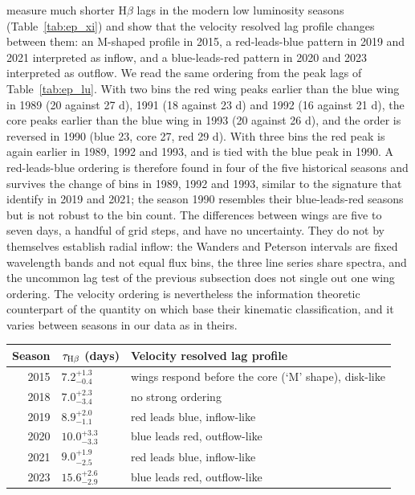 \citet{Xi2025} measure much shorter H$\beta$ lags in the modern low luminosity
seasons (Table~\ref{tab:ep_xi}) and show that the velocity resolved lag profile
changes between them: an M-shaped profile in 2015, a red-leads-blue pattern in 2019
and 2021 interpreted as inflow, and a blue-leads-red pattern in 2020 and 2023
interpreted as outflow. We read the same ordering from the peak lags of
Table~\ref{tab:ep_lu}. With two bins the red wing peaks earlier than the blue wing in
1989 (20 against 27 d), 1991 (18 against 23 d) and 1992 (16 against 21 d), the core
peaks earlier than the blue wing in 1993 (20 against 26 d), and the order is reversed
in 1990 (blue 23, core 27, red 29 d). With three bins the red peak is again earlier
in 1989, 1992 and 1993, and is tied with the blue peak in 1990. A red-leads-blue
ordering is therefore found in four of the five historical seasons and survives the
change of bins in 1989, 1992 and 1993, similar to the signature that
\citet{Xi2025} identify in 2019 and 2021; the season 1990 resembles their
blue-leads-red seasons but is not robust to the bin count. The differences between
wings are five to seven days, a handful of grid steps, and have no uncertainty.
They do not by themselves establish radial inflow: the Wanders and Peterson
intervals are fixed wavelength bands and not equal flux bins, the three line
series share spectra, and the uncommon lag test of the previous subsection does
not single out one wing ordering. The velocity ordering is nevertheless the
information theoretic counterpart of the quantity on which \citet{Xi2025} base
their kinematic classification, and it varies between seasons in our data as in
theirs.

\begin{SURDtable}
\centering
\caption{Published H$\beta$ lags of the modern seasons and the kinematic
classification of their velocity resolved lag profiles (\citealt{Xi2025},
Table~3 and Section~5.2; seasons before 2023 from \citealt{Lu2022}, updated by
\citealt{Xi2025} with a common method; for 2020 \citealt{Lu2022} found no credible
profile because of the very low variability).}
\label{tab:ep_xi}
\small
\begin{tabular}{rll}
\toprule
Season & $\tau_{\rm H\beta}$ (days) & Velocity resolved lag profile \\
\midrule
2015 & $7.2^{+1.3}_{-0.4}$ & wings respond before the core (`M' shape), disk-like \\
2018 & $7.0^{+2.3}_{-3.4}$ & no strong ordering \\
2019 & $8.9^{+2.0}_{-1.1}$ & red leads blue, inflow-like \\
2020 & $10.0^{+3.3}_{-3.3}$ & blue leads red, outflow-like \\
2021 & $9.0^{+1.9}_{-2.5}$ & red leads blue, inflow-like \\
2023 & $15.6^{+2.6}_{-2.9}$ & blue leads red, outflow-like \\
\bottomrule
\end{tabular}
\end{SURDtable}

